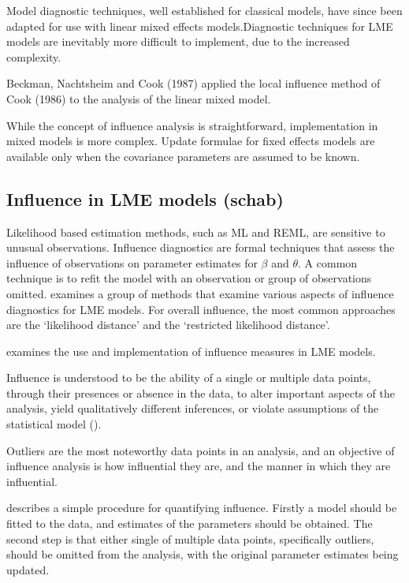 \documentclass[12pt, a4paper]{report}
\theoremstyle{plain}
\theoremstyle{definition}
\theoremstyle{remark}
\begin{document}
Model diagnostic techniques, well established for classical models, have since been adapted for use with linear mixed effects models.Diagnostic techniques for LME models are inevitably more difficult to implement, due to the increased complexity.

Beckman, Nachtsheim and Cook (1987) \citet{Beckman} applied the local influence method of Cook (1986) to the analysis of the linear mixed model.

While the concept of influence analysis is straightforward, implementation in mixed models is more complex. Update formulae for fixed effects models are available only when the covariance parameters are assumed to be known.



\subsection{Influence in LME models (schab)}
Likelihood based estimation methods, such as ML and REML, are sensitive to unusual observations. Influence diagnostics are formal techniques that assess the influence of observations on parameter estimates for $\beta$ and $\theta$. A common technique is to refit the model with an observation or group of observations omitted. \citet{west} examines a group of methods that examine various aspects of influence diagnostics for LME models.
For overall influence, the most common approaches are the `likelihood distance' and the `restricted likelihood distance'.

\citet{schab} examines the use and implementation of influence measures in LME models.

Influence is understood to be the ability of a single or multiple
data points, through their presences or absence in the data, to
alter important aspects of the analysis, yield qualitatively
different inferences, or violate assumptions of the statistical
model (\citep{schab}).

Outliers are the most noteworthy data points in an analysis, and
an objective of influence analysis is how influential they are,
and the manner in which they are influential.

\citet{schab} describes a simple procedure for quantifying
influence. Firstly a model should be fitted to the data, and
estimates of the parameters should be obtained. The second step is
that either single of multiple data points, specifically outliers,
should be omitted from the analysis, with the original parameter
estimates being updated. 
\end{document}
